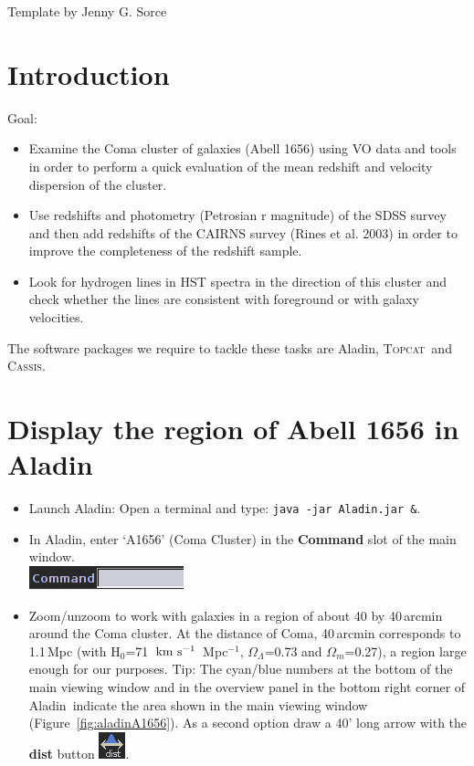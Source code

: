 \documentclass [a4paper, 12pt]{article}
\def\kms{\rm km\ s^{-1}}
\newcommand{\aladin}{{\textsc{A}{ladin}}}
\newcommand{\topcat}{{\textsc{Topcat}}}
\newcommand{\cassis}{{\textsc{Cassis}}}
\begin{document}
\vspace{3.5cm}
Template by Jenny G. Sorce


\newpage
\normalsize
\vfill
\tableofcontents
\vfill

\newpage

\justify
\section{Introduction}

Goal: 
\begin{itemize}
\item  Examine the Coma cluster of galaxies (Abell 1656) using VO data and tools in order to perform a quick evaluation of the mean redshift and velocity dispersion of the cluster. 
\item Use redshifts and photometry (Petrosian r magnitude) of the SDSS survey and then add redshifts of the CAIRNS survey (Rines et al. 2003) in order to improve the completeness of the redshift sample. 
\item Look for hydrogen lines in HST spectra in the direction of this cluster and check whether the lines are consistent with foreground or with galaxy velocities.\\
\end{itemize}
\noindent The software packages we require to tackle these tasks are \aladin, 
\topcat\ and \cassis.

\section{Display the region of Abell 1656 in \aladin}

\begin{itemize}
\item Launch \aladin: Open a terminal and type: \texttt{java -jar Aladin.jar 
\&}.
\item In \aladin, enter `A1656' (Coma Cluster) in the \textbf{Command} slot of 
the main window. \\
\includegraphics[width=0.2 \textwidth]{../images/aladin_command_empty.png}
\item Zoom/unzoom to work with galaxies in a region of about 40 by 40\,arcmin 
around the Coma cluster. At the distance of Coma, 40\,arcmin corresponds to 
1.1\,Mpc (with H$_0$=71~$\kms$~Mpc$^{-1}$, $\Omega_\Lambda$=0.73 and 
$\Omega_m$=0.27), a region large enough for our purposes. Tip: 
The cyan/blue numbers at the bottom of the main viewing window and in the 
overview panel in the bottom right corner of \aladin\ indicate the area shown 
in the main viewing window (Figure~\ref{fig:aladinA1656}). As a second option 
draw a 40' long arrow with the 
\textbf{dist} button \includegraphics[width=0.03  
\textwidth]{../images/aladin_button_distance.png}. 
\end{itemize}
\end{document}
